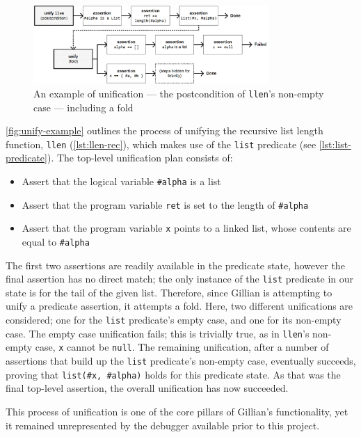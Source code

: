 \begin{figure}
  \center{}
  \includegraphics[width=0.8\textwidth]{img/unify-example.png}
  \caption{
    An example of unification --- the postcondition of \texttt{llen}'s non-empty
    case --- including a fold}\label{fig:unify-example}
\end{figure}

\autoref{fig:unify-example} outlines the process of unifying the recursive list
length function, \texttt{llen} (\autoref{lst:llen-rec}), which makes use of the
\texttt{list} predicate (see \autoref{lst:list-predicate}). The top-level
unification plan consists of:
\begin{itemize}
  \item Assert that the logical variable \texttt{\#alpha} is a list
  \item Assert that the program variable \texttt{ret} is set to the length of
        \texttt{\#alpha}
  \item Assert that the program variable \texttt{x} points to a linked list,
        whose contents are equal to \texttt{\#alpha}
\end{itemize}
The first two assertions are readily available in the predicate state, however
the final assertion has no direct match; the only instance of the \texttt{list}
predicate in our state is for the tail of the given list. Therefore, since
Gillian is attempting to unify a predicate assertion, it attempts a fold.
Here, two different unifications are considered; one for the \texttt{list}
predicate's empty case, and one for its non-empty case. The empty case
unification fails; this is trivially true, as in \texttt{llen}'s non-empty case,
\texttt{x} cannot be \texttt{null}. The remaining unification, after a number of
assertions that build up the \texttt{list} predicate's non-empty case,
eventually succeeds, proving that \texttt{list(\#x, \#alpha)} holds for this
predicate state. As that was the final top-level assertion, the overall
unification has now succeeded.

This process of unification is one of the core pillars of Gillian's
functionality, yet it remained unrepresented by the debugger available prior to
this project.


